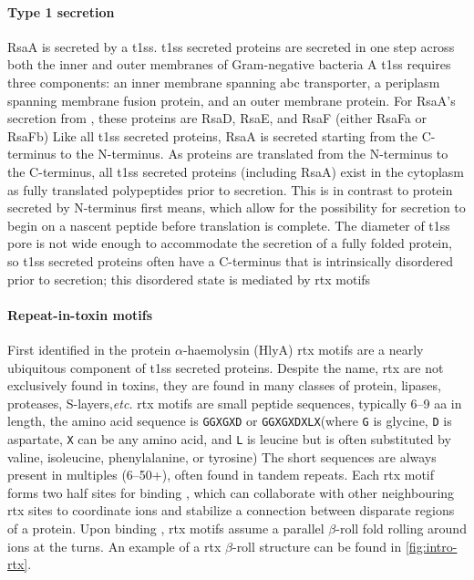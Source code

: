 \paragraph{Type 1 secretion} RsaA is secreted by a \ac{t1ss}. \Ac{t1ss} secreted proteins are secreted in one step across both the inner and outer membranes of Gram-negative
bacteria A \ac{t1ss} requires three components: an inner membrane spanning \ac{abc} transporter, a periplasm spanning membrane fusion protein, and an
outer membrane protein. For RsaA's secretion from \caulobacter, these proteins are RsaD, RsaE, and RsaF (either RsaFa or RsaFb) Like all
\ac{t1ss} secreted proteins, RsaA is secreted starting from the C-terminus to the N-terminus. As proteins are translated from the N-terminus to the C-terminus, all \ac{t1ss}
secreted proteins (including RsaA) exist in the cytoplasm as fully translated polypeptides prior to secretion. This is in contrast to protein secreted by N-terminus first means,
which allow for the possibility for secretion to begin on a nascent peptide before translation is complete. The diameter of \ac{t1ss} pore is not wide enough to accommodate the
secretion of a fully folded protein, so \ac{t1ss} secreted proteins often have a C-terminus that is intrinsically disordered prior to secretion; this disordered state is mediated
by \ac{rtx} motifs

  \paragraph{Repeat-in-toxin motifs} \label{sec:repeat-toxin-motifs} First identified in the \ecoli protein $\alpha$-haemolysin (HlyA) \ac{rtx}
motifs are a nearly ubiquitous component of \ac{t1ss} secreted proteins. Despite the name, \acl{rtx} are not exclusively found in toxins, they are found in many classes of protein,
lipases, proteases, S-layers,\textit{etc.} \ac{rtx} motifs are small peptide sequences, typically 6--9 \ac{aa} in length, the amino acid sequence is
\texttt{GGXGXD} or \texttt{GGXGXDXLX}(where \texttt{G} is glycine, \texttt{D} is aspartate, \texttt{X} can be any amino acid, and \texttt{L} is
leucine but is often substituted by valine, isoleucine, phenylalanine, or tyrosine) The short sequences are always present in
multiples (6--50+), often found in tandem repeats. Each \ac{rtx} motif forms two half sites for binding , which can collaborate with other neighbouring \ac{rtx} sites to
coordinate ions and stabilize a connection between disparate regions of a protein. Upon binding , \ac{rtx} motifs assume a parallel $\beta$-roll
fold rolling around  ions at the turns. An example of a \ac{rtx} $\beta$-roll structure can be found in \cref{fig:intro-rtx}.

